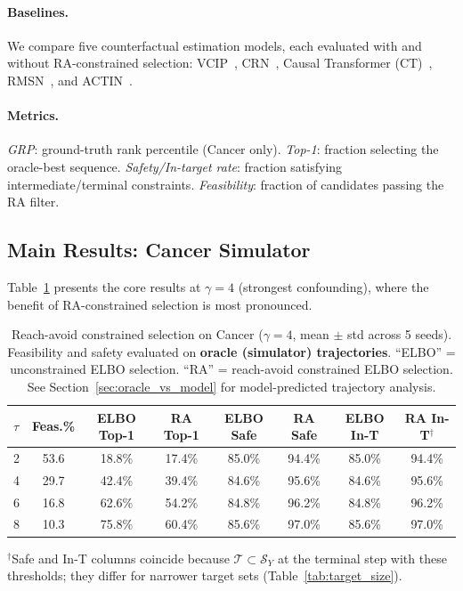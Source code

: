 \documentclass{article}
\newcommand{\cT}{\mathcal{T}}
\newcommand{\cS}{\mathcal{S}}
\begin{document}
\vspace{-0.8em}
\paragraph{Baselines.} We compare five counterfactual estimation models, each evaluated with and without RA-constrained selection: VCIP~\citep{melnychuk2025vcip}, CRN~\citep{bica2020crn}, Causal Transformer (CT)~\citep{melnychuk2022causal}, RMSN~\citep{lim2018forecasting}, and ACTIN~\citep{seedat2022actin}.

\vspace{-0.8em}
\paragraph{Metrics.} \emph{GRP}: ground-truth rank percentile (Cancer only). \emph{Top-1}: fraction selecting the oracle-best sequence. \emph{Safety/In-target rate}: fraction satisfying intermediate/terminal constraints. \emph{Feasibility}: fraction of candidates passing the RA filter.


\subsection{Main Results: Cancer Simulator}
\label{sec:cancer_results}

Table~\ref{tab:main_cancer} presents the core results at $\gamma = 4$ (strongest confounding), where the benefit of RA-constrained selection is most pronounced.

\begin{table}[t]
\centering
\caption{Reach-avoid constrained selection on Cancer ($\gamma = 4$, mean $\pm$ std across 5 seeds). Feasibility and safety evaluated on \textbf{oracle (simulator) trajectories}. ``ELBO'' = unconstrained ELBO selection. ``RA'' = reach-avoid constrained ELBO selection. See Section~\ref{sec:oracle_vs_model} for model-predicted trajectory analysis.}
\label{tab:main_cancer}
\small
\begin{tabular}{l c c c c c c c}
\toprule
$\tau$ & Feas.\% & ELBO Top-1 & RA Top-1 & ELBO Safe & RA Safe & ELBO In-T & RA In-T$^\dagger$ \\
\midrule
2 & 53.6 & 18.8\% & 17.4\% & 85.0\% & 94.4\% & 85.0\% & 94.4\% \\
4 & 29.7 & 42.4\% & 39.4\% & 84.6\% & 95.6\% & 84.6\% & 95.6\% \\
6 & 16.8 & 62.6\% & 54.2\% & 84.8\% & 96.2\% & 84.8\% & 96.2\% \\
8 & 10.3 & 75.8\% & 60.4\% & 85.6\% & 97.0\% & 85.6\% & 97.0\% \\
\bottomrule
\end{tabular}
\vspace{0.3em}

{\footnotesize $^\dagger$Safe and In-T columns coincide because $\cT \subset \cS_Y$ at the terminal step with these thresholds; they differ for narrower target sets (Table~\ref{tab:target_size}).}
\end{table}
\end{document}
